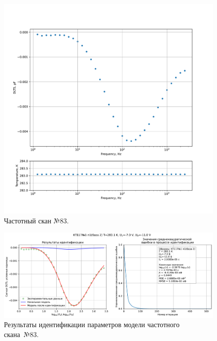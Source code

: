 \begin{figure}[!ht]
    \centering
    \includegraphics[width=1\textwidth]{../plots/КТ117№1_п1(база 2)_2500Гц-1Гц_1пФ_+10С_-7В-11В_100мВ_20мкс_шаг_0,1.pdf}
    \caption{Частотный скан №83.}
    \label{pic:frequency_scan_83}
\end{figure}

\begin{figure}[!ht]
    \centering
    \includegraphics[width=1\textwidth]{../plots/КТ117№1_п1(база 2)_2500Гц-1Гц_1пФ_+10С_-7В-11В_100мВ_20мкс_шаг_0,1_model.pdf}
    \caption{Результаты идентификации параметров модели частотного скана~№83.}
    \label{pic:frequency_scan_model83}
\end{figure}

\pagebreak


